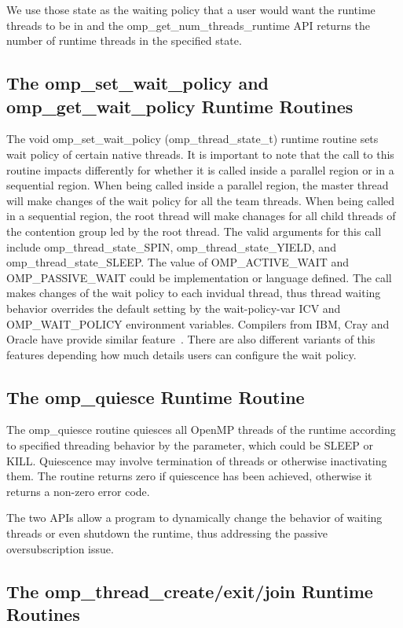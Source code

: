 We use those state as the waiting policy that a user would want the runtime threads to be in and the {\sf omp\_get\_num\_threads\_runtime} API returns the number of runtime threads in the specified state.

\subsection{The {\sf omp\_set\_wait\_policy} and {\sf omp\_get\_wait\_policy} Runtime Routines}
The {\sf void omp\_set\_wait\_policy (omp\_thread\_state\_t)} runtime routine sets wait policy of certain 
native threads. It is important to note that the call to this routine impacts differently for 
whether it is called inside a {\sf parallel} region or in a sequential region. 
When being called inside a parallel region, the master thread will make changes of the wait policy for all the team 
threads. When being called in a sequential region, the root thread will make chanages for all child threads of 
the contention group led by the root thread. The valid arguments for this call 
include {\sf omp\_thread\_state\_SPIN}, {\sf omp\_thread\_state\_YIELD}, 
and {\sf omp\_thread\_state\_SLEEP}. The value of  {\sf OMP\_ACTIVE\_WAIT} and 
{\sf OMP\_PASSIVE\_WAIT} could be implementation or language defined. The call makes changes of the wait
policy to each invidual thread, thus thread waiting behavior overrides the default 
setting by the wait-policy-var ICV and OMP\_WAIT\_POLICY environment variables. 
Compilers from IBM, Cray and Oracle have provide similar feature~\cite{ibmwait,craywait,oraclewait}.
There are also different variants of this features depending how much details users can configure
the wait policy.

\subsection{The {\sf omp\_quiesce} Runtime Routine}
The {\sf omp\_quiesce} routine quiesces all OpenMP threads of the runtime according to 
specified threading behavior by the parameter, which could be SLEEP or KILL. 
Quiescence may involve termination of threads or otherwise inactivating them. The routine returns zero if quiescence has been achieved, otherwise it returns a non-zero error code.

The two APIs allow a program to dynamically change the behavior of waiting threads or even shutdown the runtime, thus addressing the passive
oversubscription issue. 


\subsection{The {\sf omp\_thread\_create/exit/join} Runtime Routines}

